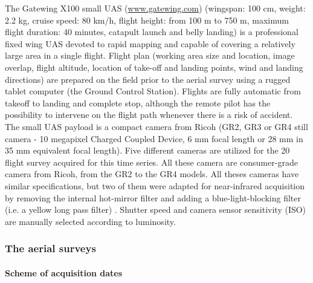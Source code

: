\documentclass[remotesensing,article,submit,moreauthors,pdftex,12pt,a4paper]{mdpi} %
\begin{document}
The Gatewing X100 small UAS (\url{www.gatewing.com}) (wingspan: 100 cm, weight: 2.2 kg, cruise speed: 80 km/h, flight height: from 100 m to 750 m, maximum flight duration: 40 minutes, catapult launch and belly landing) is a professional fixed wing UAS devoted to rapid mapping and capable of covering a relatively large area in a single flight. Flight plan (working area size and location, image overlap, flight altitude, location of take-off and landing points, wind and landing directions) are prepared on the field prior to the aerial survey using a rugged tablet computer (the Ground Control Station). Flights are fully automatic from takeoff to landing and complete stop, although the remote pilot has the possibility to intervene on the flight path whenever there is a risk of accident. 
The small UAS payload is a compact camera from Ricoh (GR2, GR3 or GR4 still camera - 10 megapixel Charged Coupled Device, 6 mm focal length or 28 mm in 35 mm equivalent focal length). Five different cameras are utilized for the 20 flight survey acquired for this time series. All these camera are consumer-grade camera from Ricoh, from the GR2 to the GR4 models. All theses cameras have similar specifications, but two of them were adapted for near-infrared acquisition by removing the internal hot-mirror filter and adding a blue-light-blocking filter (i.e. a yellow long pass filter) \citep{aber_small-format_2010}. Shutter speed and camera sensor sensitivity (ISO) are manually selected according to luminosity.


\subsubsection{The aerial surveys}

\paragraph{Scheme of acquisition dates}
\end{document}
